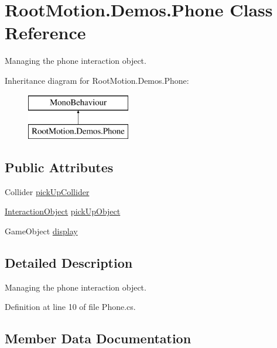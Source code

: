 \hypertarget{class_root_motion_1_1_demos_1_1_phone}{}\section{Root\+Motion.\+Demos.\+Phone Class Reference}
\label{class_root_motion_1_1_demos_1_1_phone}


Managing the phone interaction object.  


Inheritance diagram for Root\+Motion.\+Demos.\+Phone\+:\begin{figure}[H]
\begin{center}
\leavevmode
\includegraphics[height=2.000000cm]{class_root_motion_1_1_demos_1_1_phone}
\end{center}
\end{figure}
\subsection*{Public Attributes}
\begin{DoxyCompactItemize}
\item 
Collider \mbox{\hyperlink{class_root_motion_1_1_demos_1_1_phone_a903f371941a550eaba6013b6d22f6348}{pick\+Up\+Collider}}
\item 
\mbox{\hyperlink{class_root_motion_1_1_final_i_k_1_1_interaction_object}{Interaction\+Object}} \mbox{\hyperlink{class_root_motion_1_1_demos_1_1_phone_aa5fd5026ac04f48d50d51bc8c34d1adb}{pick\+Up\+Object}}
\item 
Game\+Object \mbox{\hyperlink{class_root_motion_1_1_demos_1_1_phone_a52ec5907a36bb1b66bdbac9000a3f470}{display}}
\end{DoxyCompactItemize}


\subsection{Detailed Description}
Managing the phone interaction object. 



Definition at line 10 of file Phone.\+cs.



\subsection{Member Data Documentation}
\mbox{\label{class_root_motion_1_1_demos_1_1_phone_a52ec5907a36bb1b66bdbac9000a3f470}} 
